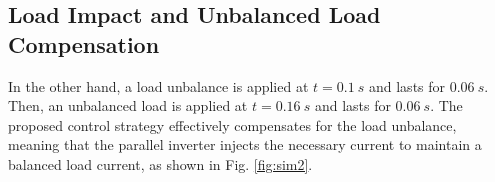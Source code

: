 \subsection{Load Impact and Unbalanced Load Compensation}

In the other hand, a load unbalance is applied at $t=0.1\ s$ and lasts for $0.06\ s$. Then, an unbalanced load is applied at $t=0.16\ s$ and lasts for $0.06\ s$. The proposed control strategy effectively compensates for the load unbalance, meaning that the parallel inverter injects the necessary current to maintain a balanced load current, as shown in Fig. \ref{fig:sim2}.


